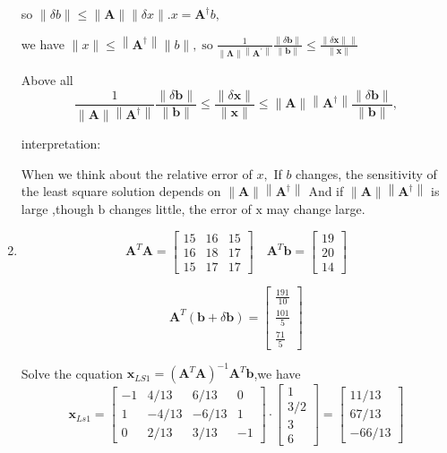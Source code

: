 \documentclass[english,onecolumn]{IEEEtran}
\begin{document}
\begin{enumerate}
	so $\|\delta b\| \leq\|\mathbf{A}\|\|\delta x\| . x=\mathbf{A}^{\dagger} b,$ 
	
	we have
	$\|x\| \leq\left\|\mathbf{A}^{\dagger}\right\|\|b\|, \operatorname{so} \frac{1}{\|\boldsymbol{\Lambda}\|\left\|\boldsymbol{A}^{\prime}\right\|} \frac{\|\delta \mathbf{b}\|}{\|\mathbf{b}\|} \leq \frac{\|\delta \mathbf{x}\| \|}{\|\mathbf{x}\|}$
	
	Above all
	$$
	\frac{1}{\|\mathbf{A}\|\left\|\mathbf{A}^{\dagger}\right\|} \frac{\|\delta \mathbf{b}\|}{\|\mathbf{b}\|} \leq \frac{\|\delta \mathbf{x}\|}{\|\mathbf{x}\|} \leq\|\mathbf{A}\|\left\|\mathbf{A}^{\dagger}\right\| \frac{\|\delta \mathbf{b}\|}{\|\mathbf{b}\|},
	$$
	
	interpretation:
	
	When we think about the relative error of $x,$ If $b$ changes, the sensitivity of the least square solution depends
	on $\|\mathbf{A}\|\left\|\mathbf{A}^{\dagger}\right\|$ And if $\|\mathbf{A}\|\left\|\mathbf{A}^{\dagger}\right\|$ is large ,though $\mathrm{b}$ changes little, the error of $\mathrm{x}$ may change large.
	
	\item 
	$$
	\mathbf{A}^{T} \mathbf{A}=\left[\begin{array}{lll}
		15 & 16 & 15 \\
		16 & 18 & 17 \\
		15 & 17 & 17
	\end{array}\right] \quad \mathbf{A}^{T} \mathbf{b}=\left[\begin{array}{l}
		19 \\
		20 \\
		14
	\end{array}\right]
	$$
	
	$$
	\mathbf{A}^{T}(\mathbf{b}+\delta \mathbf{b})=\left[\begin{array}{c}
		\frac{191}{10} \\
		\frac{101}{5} \\
		\frac{71}{5}
	\end{array}\right]
	$$
	
	Solve the cquation $\mathbf{x}_{LS1}=\left(\mathbf{A}^{T} \mathbf{A}\right)^{-1} \mathbf{A}^{T} \mathbf{b}$,we have
	$$
	\mathbf{x}_{Ls1}
	=\left[\begin{array}{cccc}
		-1 & 4 / 13 & 6 / 13 & 0 \\
		1 & -4 / 13 & -6 / 13 & 1 \\
		0 & 2 / 13 & 3 / 13 & -1
	\end{array}\right] \cdot\left[\begin{array}{c}
		1 \\
		3 / 2 \\
		3 \\
		6
	\end{array}\right]=\left[\begin{array}{c}
		11 / 13 \\
		67 / 13 \\
		-66 / 13
	\end{array}\right]
	$$
	

\end{enumerate}
\end{document}
